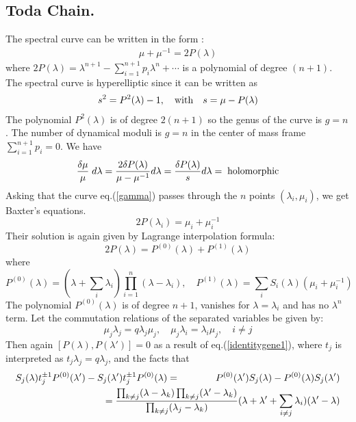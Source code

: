 \documentclass[a4paper,11pt]{article}
\begin{document}
\subsection{Toda Chain.}

The spectral curve can be written in the form \cite{FaTa86, BaBeTa03}:
\begin{eqnarray}
\mu + \mu^{-1} = 2 P(\lambda) 
\label{gamma}
\end{eqnarray}
where  $2P(\lambda)=\lambda^{n+1} - \sum_{i=1}^{n+1} p_i \lambda^n+\cdots $ 
is a polynomial of degree
$(n+1)$.  The spectral curve is  hyperelliptic since it can
be written as
\begin{eqnarray}
s^2 = P^2(\lambda) - 1, \quad {\rm with}\quad  s = \mu -P(\lambda)
 \label{specbis} 
\end{eqnarray} 
The polynomial $P^2(\lambda)$
is of degree $2(n+1)$ so the genus of the curve is $g = n$. The number
of dynamical moduli is $g=n$ in the center of mass frame $\sum_{i=1}^{n+1} p_i  =0$.
We have
\begin{eqnarray*}
{\delta \mu \over \mu}\;d\lambda = {2 \delta P(\lambda) \over \mu - \mu^{-1}}  d\lambda = 
 {\delta P(\lambda) \over  s} d\lambda =\; {\rm holomorphic}
\end{eqnarray*}
Asking that the curve eq.(\ref{gamma}) passes through the $n$ points $(\lambda_i,\mu_i)$,
we get Baxter's equations. 
$$
 2 P(\lambda_i) = \mu_i + \mu_i^{-1} 
$$
Their solution is again given by
Lagrange interpolation formula:
$$
2P(\lambda) = P^{(0)}(\lambda) + P^{(1)}(\lambda)
$$
where
$$
P^{(0)}(\lambda) =  (\lambda + \sum_i \lambda_i) \prod_{i=1}^n (\lambda - \lambda_i), \quad
P^{(1)}(\lambda) =   \sum_i  S_i(\lambda) (\mu_i + \mu_i^{-1})
$$
The polynomial $P^{(0)}(\lambda)$ is of degree $n+1$, vanishes for $\lambda = \lambda_i$ and has no  $\lambda^n$ term.
Let the commutation relations of the separated variables be given by:
$$
\mu_j \lambda_j = q \lambda_j \mu_j , \quad \mu_j \lambda_i =  \lambda_i \mu_j,
\quad i \neq j
$$
Then again $[ P(\lambda), P(\lambda') ] =0$ as a result of eq.(\ref{identitygene1}),
where $t_j$ is interpreted as $t_j \lambda_j = q \lambda_j$, and the
facts that
\begin{eqnarray*}
 S_j(\lambda) t^{\pm 1}_j  P^{(0)}(\lambda')
- S_j(\lambda') t^{\pm 1}_j  P^{(0)}(\lambda) &=&    P^{(0)}(\lambda')  S_j(\lambda)  -  P^{(0)}(\lambda)   S_j(\lambda')  \\
&& \hskip -3cm
={ \prod_{k\neq j }(\lambda - \lambda_k )\prod_{k\neq j }(\lambda' - \lambda_k )
\over \prod_{k\neq j} (\lambda_j - \lambda_k) } (\lambda + \lambda'
+ \sum_{i\neq j} \lambda_i)(\lambda'-\lambda)
\end{eqnarray*}
\end{document}
